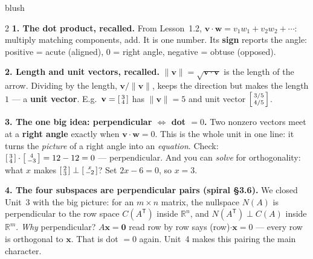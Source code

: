 \documentclass[10pt]{article}
\newcommand{\vv}{\mathbf{v}}
\newcommand{\ww}{\mathbf{w}}
\newcommand{\zero}{\mathbf{0}}
\newcommand{\T}{\mathsf{T}}
\begin{document}
\begin{skillbox}[Lesson]{blush}
\begin{multicols}{2}
\textbf{1. The dot product, recalled.} From Lesson~1.2, $\vv\cdot\ww=v_1w_1+v_2w_2+\cdots$:
multiply matching components, add. It is one number. Its \textbf{sign} reports the angle: positive
= acute (aligned), $0$ = right angle, negative = obtuse (opposed).

\textbf{2. Length and unit vectors, recalled.} $\|\vv\|=\sqrt{\vv\cdot\vv}$ is the length of the
arrow. Dividing by the length, $\vv/\|\vv\|$, keeps the direction but makes the length $1$ --- a
\textbf{unit vector}. E.g.\ $\vv=\begin{bsmallmatrix} 3\\4 \end{bsmallmatrix}$ has $\|\vv\|=5$ and
unit vector $\begin{bsmallmatrix} 3/5\\4/5 \end{bsmallmatrix}$.

\textbf{3. The one big idea: perpendicular $\Leftrightarrow$ dot $=0$.} Two nonzero vectors meet
at a \textbf{right angle} exactly when $\vv\cdot\ww=0$. This is the whole unit in one line: it
turns the \emph{picture} of a right angle into an \emph{equation}. Check:
$\begin{bsmallmatrix} 3\\4 \end{bsmallmatrix}\cdot\begin{bsmallmatrix} 4\\-3 \end{bsmallmatrix}=12-12=0$
--- perpendicular. And you can \emph{solve} for orthogonality: what $x$ makes
$\begin{bsmallmatrix} 2\\3 \end{bsmallmatrix}\perp\begin{bsmallmatrix} x\\-2 \end{bsmallmatrix}$?
Set $2x-6=0$, so $x=3$.

\columnbreak

\textbf{4. The four subspaces are perpendicular pairs (spiral §3.6).} We closed Unit~3 with the
big picture: for an $m\times n$ matrix, the nullspace $N(A)$ is perpendicular to the row space
$C(A^{\T})$ inside $\mathbb{R}^n$, and $N(A^{\T})\perp C(A)$ inside $\mathbb{R}^m$. \emph{Why}
perpendicular? $A\mathbf x=\zero$ read row by row says (row)$\cdot\mathbf x=0$ --- every row is
orthogonal to $\mathbf x$. That is dot $=0$ again. Unit~4 makes this pairing the main character.


\end{multicols}
\end{skillbox}
\end{document}
